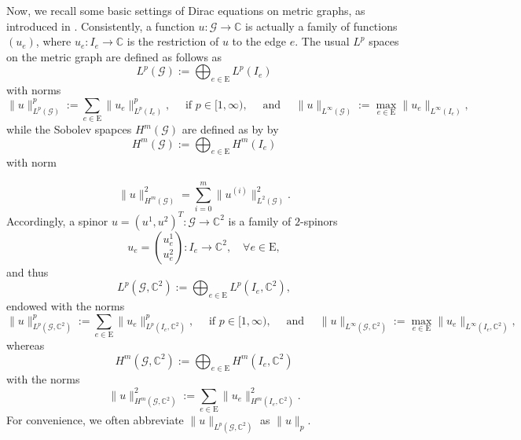 \documentclass[11pt]{amsart}
\newcommand{\norm}[1]{\lVert#1\rVert}
\newcommand{\G}{\mathcal{G}}
\numberwithin{equation}{section}
\begin{document}
Now, we recall some basic settings of Dirac equations on metric graphs, as introduced in \cite{Bo,Bo1}.
Consistently, a function $u: \G \to \mathbb{C}$ is actually a family of functions $(u_e)$, where $u_e: I_e \to \mathbb{C}$ is the restriction of $u$ to the edge $e$. The usual $L^p$ spaces on the metric graph  are defined as follows
as
$$
L^p(\mathcal{G}):=\bigoplus_{e \in \mathrm{E}} L^p(I_e)
$$
with norms
$$
\norm{u}_{L^p(\mathcal{G})}^p := \sum_{e \in \mathrm{E}}\norm{u_e}_{L^p(I_e)}^p, \quad \text { if } p \in[1, \infty), \quad \text { and } \quad \norm{u}_{L^{\infty}(\mathcal{G})}:=\max _{e \in \mathrm{E}}\norm{u_e}_{L^{\infty}(I_e)},
$$
while the Sobolev spapces $H^m(\G)$ are defined as by
by
$$
H^m(\mathcal{G}):=\bigoplus_{e \in \mathrm{E}} H^m(I_e)
$$ with norm

$$
\norm{u}_{H^m(\G)}^2=\sum_{i=0}^m\norm{u^{(i)}}_{L^2(\mathcal{G})}^2.
$$
Accordingly, a spinor $u = (u^1, u^2)^T: \G \to \mathbb{C}^2$ is a family of $2$-spinors
$$
u_e=\binom{u_e^1}{u_e^2}: I_e \longrightarrow \mathbb{C}^2, \quad \forall e \in \mathrm{E},
$$
and thus
$$
L^p(\mathcal{G}, \mathbb{C}^2):=\bigoplus_{e \in \mathrm{E}} L^p(I_e, \mathbb{C}^2),
$$
endowed with the norms
$$
\norm{u}_{L^p(\G, \mathbb{C}^2)}^p := \sum_{e \in \mathrm{E}}\norm{u_e}_{L^p(I_e, \mathbb{C}^2)}^p, \quad \text { if } p \in[1, \infty), \quad \text { and } \quad \norm{u}_{L^{\infty}(\G, \mathbb{C}^2)}:=\max_{e \in \mathrm{E}}\norm{u_e}_{L^{\infty}(I_e, \mathbb{C}^2)},
$$
whereas
$$
H^m(\mathcal{G}, \mathbb{C}^2):=\bigoplus_{e \in \mathrm{E}} H^m(I_e, \mathbb{C}^2)
$$
with the norms
$$
\|u\|_{H^m(\G, \mathbb{C}^2)}^2:=\sum_{e \in \mathrm{E}}\norm{u_e}_{H^m(I_e, \mathbb{C}^2)}^2.
$$
For convenience, we often abbreviate $\norm{u}_{L^p(\G, \mathbb{C}^2)}$ as $\norm{u}_p$.
\end{document}
